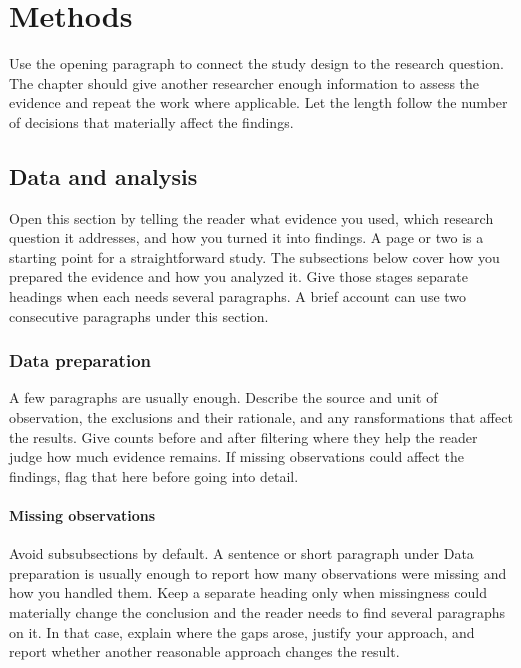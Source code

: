 \chapter{Methods}
\label{chap:methods}

Use the opening paragraph to connect the study design to the research question. The chapter should give another researcher enough information to assess the evidence and repeat the work where applicable. Let the length follow the number of decisions that materially affect the findings.


\section{Data and analysis}
Open this section by telling the reader what evidence you used, which research question it addresses, and how you turned it into findings. A page or two is a starting point for a straightforward study. The subsections below cover how you prepared the evidence and how you analyzed it. Give those stages separate headings when each needs several paragraphs. A brief account can use two consecutive paragraphs under this section.

\subsection{Data preparation}
A few paragraphs are usually enough. Describe the source and unit of observation, the exclusions and their rationale, and any ransformations that affect the results. Give counts before and after filtering where they help the reader judge how much evidence remains. If missing observations could affect the findings, flag that here before going into detail.

\subsubsection{Missing observations}
Avoid subsubsections by default. A sentence or short paragraph under Data preparation is usually enough to report how many observations were missing and how you handled them. Keep a separate heading only when missingness could materially change the conclusion and the reader needs to find several paragraphs on it. In that case, explain where the gaps arose, justify your approach, and report whether another reasonable approach changes the result.

